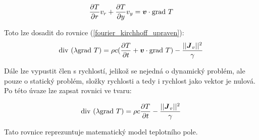\begin{equation}
    \frac{\partial T}{\partial r} v_r + \frac{\partial T}{\partial y} v_y = \mbox{\boldmath$v$} \cdot \mathrm{grad}\  T
	\label{gradient_teplota} 
\end{equation} 

Toto lze dosadit do rovnice (\ref{fourier_kirchhoff_upraven}):
\begin{equation}
	\mathrm{div}\  ( \lambda  \mathrm{grad}\  T) = \rho c (\frac{\partial T}{\partial t} + \mbox{\boldmath$v$} \cdot \mathrm{grad}\  T ) - \frac{||\mbox{\boldmath$J$}_{v}||^{2}}{\gamma}
	\label{matematicky_model_teplotni_pole_rychlost} 
\end{equation} 

Dále lze vypustit člen s rychlostí, jelikož se nejedná o dynamický problém, ale pouze o statický problém, složky rychlosti a tedy i rychlost jako vektor je nulová. Po této úvaze lze zapsat rovnici ve tvaru:

\begin{equation}
	\mathrm{div}\  ( \lambda \mathrm{grad}\  T) = \rho c \frac{\partial T}{\partial t} - \frac{||\mbox{\boldmath$J$}_{v}||^{2}}{\gamma}
	\label{matematicky_model_teplotni_pole} 
\end{equation}

Tato rovnice reprezuntuje matematický model teplotního pole.